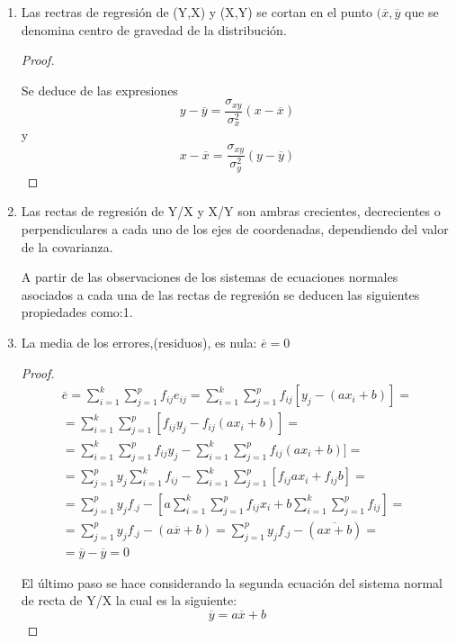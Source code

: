 \documentclass{article}
\begin{document}
\begin{enumerate}

	
\item Las rectras de regresión de (Y,X) y (X,Y)  se cortan en el punto $(\overline{x},\overline{y}$ que se denomina centro de gravedad de la distribución.

\begin{proof}
$ $\newline

Se deduce de las expresiones
$$ y - \overline{y} = \frac{\sigma_{xy}}{\sigma_x^2} (x - \overline{x}) $$
y 
$$ x - \overline{x} = \frac{\sigma_{xy}}{\sigma_y^2} (y - \overline{y} ) $$
\end{proof}
\item Las rectas de regresión de Y/X y X/Y son ambras crecientes, decrecientes o perpendiculares a cada uno de los ejes de coordenadas, dependiendo del valor de la covarianza.

A partir de las observaciones de los sistemas de ecuaciones normales asociados a cada una de las rectas de regresión se deducen las siguientes propiedades como:1.

\item La media de los errores,(residuos), es nula: $\overline{e} = 0$

\begin{proof}
$ $\newline
\begin{align*}
\overline{e} = \sum_{i=1}^k\sum_{j=1}^p f_{ij}e_{ij} = \sum_{i=1}^k\sum_{j=1}^p f_{ij}[y_j - (ax_i +b)]  = \\
    = \sum_{i=1}^k\sum_{j=1}^p [f_{ij}y_j - f_ {ij}(ax_i +b)] = \\
    = \sum_{i=1}^k\sum_{j=1}^p f_{ij}y_j - \sum_{i=1}^k\sum_{j=1}^p f_ {ij}(ax_i +b)] = \\
    = \sum_{j=1}^p y_j \sum_{i=1}^k f_{ij} - \sum_{i=1}^k\sum_{j=1}^p [f_{ij}ax_i + f_{ij}b] = \\
    = \sum_{j=1}^p y_j f_{.j} - \left[a\sum_{i=1}^k\sum_{j=1}^p f_{ij}  x_i   +  b\sum_{i=1}^k\sum_{j=1}^p f_{ij}\right] = \\ 
     = \sum_{j=1}^p y_j f_{.j} - (a\overline{x}+b) = \sum_{j=1}^p y_j f_{.j} - (\overline{ax+b}) = \\
	= \overline{y} - \overline{y} = 0
\end{align*}
	
	El último paso se hace considerando la segunda ecuación del sistema normal de recta de Y/X la cual es la siguiente:
	$$ \overline{y} = a\overline{x} + b $$
\end{proof}


\end{enumerate}
\end{document}
